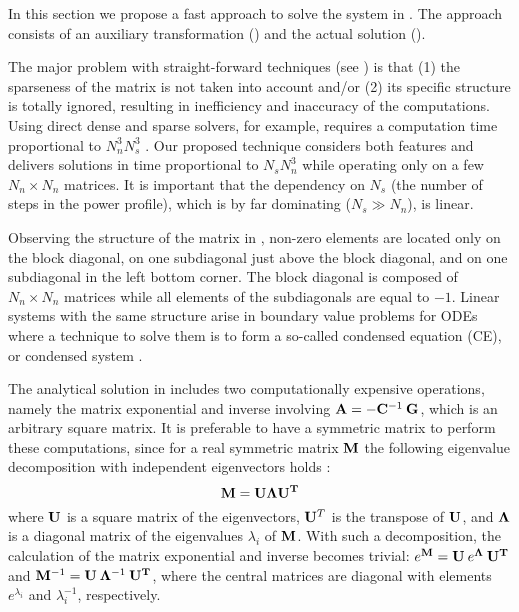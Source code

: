 In this section we propose a fast approach to solve the system in . The approach consists of an auxiliary transformation () and the actual solution ().

The major problem with straight-forward techniques (see ) is that (1) the sparseness of the matrix is not taken into account and/or (2) its specific structure is totally ignored, resulting in inefficiency and inaccuracy of the computations. Using direct dense and sparse solvers, for example, requires a computation time proportional to $N_n^3 N_s^3$ \cite{press2007}. Our proposed technique considers both features and delivers solutions in time proportional to $N_s N_n^3$ while operating only on a few $N_n \times N_n$ matrices. It is important that the dependency on $N_s$ (the number of steps in the power profile), which is by far dominating ($N_s \gg N_n$), is linear.

Observing the structure of the matrix in , non-zero elements are located only on the block diagonal, on one subdiagonal just above the block diagonal, and on one subdiagonal in the left bottom corner. The block diagonal is composed of $N_n \times N_n$ matrices while all elements of the subdiagonals are equal to $-1$. Linear systems with the same structure arise in boundary value problems for ODEs where a technique to solve them is to form a so-called condensed equation (CE), or condensed system \cite{stoer2002}.

 \label{sec:ce-auxiliary}
The analytical solution in  includes two computationally expensive operations, namely the matrix exponential and inverse involving \mbox{$\mathbf{A} = - \mathbf{C}^{-1} \: \mathbf{G}$}, which is an arbitrary square matrix. It is preferable to have a symmetric matrix to perform these computations, since for a real symmetric matrix $\mathbf{M}$ the following eigenvalue decomposition with independent eigenvectors holds \cite{press2007}:
\begin{equation} \label{eq:eigenvalue-decomposition}
  \mathbf{M} = \mathbf{U} \mathbf{\Lambda} \mathbf{U}^{\mathbf{T}}
\end{equation}
where $\mathbf{U}$ is a square matrix of the eigenvectors, $\mathbf{U}^T$ is the transpose of $\mathbf{U}$, and $\mathbf{\Lambda}$ is a diagonal matrix of the eigenvalues $\lambda_i$ of $\mathbf{M}$. With such a decomposition, the calculation of the matrix exponential and inverse becomes trivial: $e^{\mathbf{M}} = \mathbf{U} \: e^{\mathbf{\Lambda}} \: \mathbf{U}^{\mathbf{T}}$ and $\mathbf{M}^{-1} = \mathbf{U} \: \mathbf{\Lambda}^{-1} \: \mathbf{U}^{\mathbf{T}}$, where the central matrices are diagonal with elements $e^{\lambda_i}$ and $\lambda_i^{-1}$, respectively.

